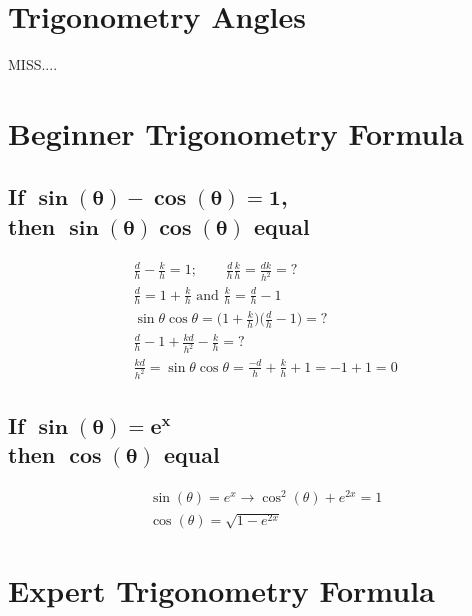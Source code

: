 \documentclass{article}
\begin{document}
\section{Trigonometry Angles}
MISS....

\section{Beginner Trigonometry Formula}

\begin{multicols}{2}

\subsection{If $\mathbf{\sin(\theta)-\cos(\theta)=1}$, \\ then $\mathbf{\sin(\theta)\cos(\theta)}$ equal}
\begin{align*}
    &\frac{d}{h} - \frac{k}{h} = 1; \qquad \frac{d}{h}\frac{k}{h} = \frac{dk}{h^2} = ? \\
    &\frac{d}{h} = 1 + \frac{k}{h} \text{ and } \frac{k}{h}=\frac{d}{h}-1 \\
    &\sin\theta \cos\theta = \Big(1 + \frac{k}{h}\Big)\Big(\frac{d}{h}-1\Big) = ? \\
    &\frac{d}{h} - 1 + \frac{kd}{h^2} - \frac{k}{h} = ?\\
    &\frac{kd}{h^2}= \sin\theta \cos\theta = \frac{-d}{h} + \frac{k}{h}+1=-1+1=0
\end{align*}

\subsection{If $\mathbf{\sin(\theta) = e^x}$  \\ then $\mathbf{\cos(\theta)}$ equal}
\begin{align*}
    &\sin(\theta)=e^x \rightarrow \cos^2(\theta) + e^{2x} = 1 \\
    &\cos(\theta)= \sqrt{1-e^{2x}}
\end{align*}

\end{multicols}


\section{Expert Trigonometry Formula}
\end{document}
